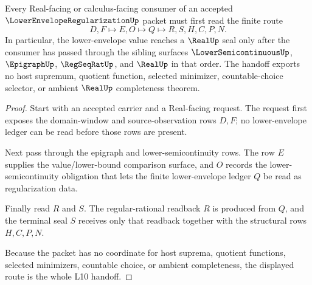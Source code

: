 \begin{theorem}
\label{thm:lower-envelope-regularization-l10-handoff}
Every Real-facing or calculus-facing consumer of an accepted $\LowerEnvelopeRegularizationUp$ packet must first read the finite route
$$
D,F \longmapsto E,O \longmapsto Q \longmapsto R,S,H,C,P,N .
$$
In particular, the lower-envelope value reaches a $\RealUp$ seal only after the consumer has passed through the sibling surfaces $\LowerSemicontinuousUp$, $\EpigraphUp$, $\RegSeqRatUp$, and $\RealUp$ in that order. The handoff exports no host supremum, quotient function, selected minimizer, countable-choice selector, or ambient $\RealUp$ completeness theorem.
\end{theorem}
\begin{proof}
Start with an accepted carrier and a Real-facing request. The request first exposes the domain-window and source-observation rows $D,F$; no lower-envelope ledger can be read before those rows are present.

Next pass through the epigraph and lower-semicontinuity rows. The row $E$ supplies the value/lower-bound comparison surface, and $O$ records the lower-semicontinuity obligation that lets the finite lower-envelope ledger $Q$ be read as regularization data.

Finally read $R$ and $S$. The regular-rational readback $R$ is produced from $Q$, and the terminal seal $S$ receives only that readback together with the structural rows $H,C,P,N$.

Because the packet has no coordinate for host suprema, quotient functions, selected minimizers, countable choice, or ambient completeness, the displayed route is the whole L10 handoff.
\end{proof}




